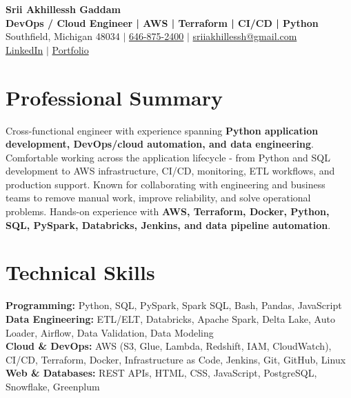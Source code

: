 \documentclass[letterpaper,10pt]{article}
\begin{document}
\fontsize{9.35pt}{10.45pt}\selectfont

\begin{center}
    {\LARGE \textbf{Srii Akhillessh Gaddam}} \\[-1pt]
    \textbf{DevOps / Cloud Engineer | AWS | Terraform | CI/CD | Python} \\[2pt]
    Southfield, Michigan 48034 $|$
    \href{tel:6468752400}{646-875-2400} $|$
    \href{mailto:sriiakhillessh@gmail.com}{sriiakhillessh@gmail.com} \\[1pt]
    \href{https://www.linkedin.com/in/srii-akhiilessh-gaddam-b48668191/}{LinkedIn} $|$
    \href{https://sriiakhillesshg.github.io/portfolio/}{Portfolio}
\end{center}
\vspace{-8pt}

\section{Professional Summary}
\small{Cross-functional engineer with experience spanning \textbf{Python application development, DevOps/cloud automation, and data engineering}. Comfortable working across the application lifecycle - from Python and SQL development to AWS infrastructure, CI/CD, monitoring, ETL workflows, and production support. Known for collaborating with engineering and business teams to remove manual work, improve reliability, and solve operational problems. Hands-on experience with \textbf{AWS, Terraform, Docker, Python, SQL, PySpark, Databricks, Jenkins, and data pipeline automation}.}

\section{Technical Skills}
\small{
\textbf{Programming:} Python, SQL, PySpark, Spark SQL, Bash, Pandas, JavaScript \\
\textbf{Data Engineering:} ETL/ELT, Databricks, Apache Spark, Delta Lake, Auto Loader, Airflow, Data Validation, Data Modeling \\
\textbf{Cloud \& DevOps:} AWS (S3, Glue, Lambda, Redshift, IAM, CloudWatch), CI/CD, Terraform, Docker, Infrastructure as Code, Jenkins, Git, GitHub, Linux \\
\textbf{Web \& Databases:} REST APIs, HTML, CSS, JavaScript, PostgreSQL, Snowflake, Greenplum
}
\end{document}

